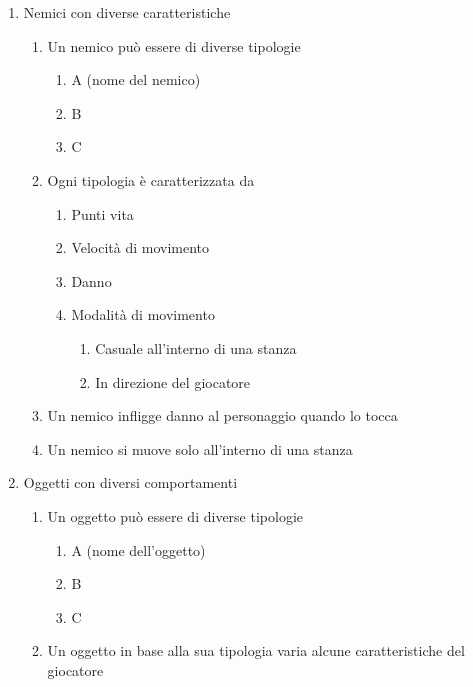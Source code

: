 \begin{enumerate}
    \item Nemici con diverse caratteristiche
    \begin{enumerate}
        \item Un nemico può essere di diverse tipologie
             \begin{enumerate}
                \item A (nome del nemico)
                \item B
                \item C
            \end{enumerate}
        \item Ogni tipologia è caratterizzata da
            \begin{enumerate}
                \item Punti vita
                \item Velocità di movimento
                \item Danno
                \item Modalità di movimento
                 \begin{enumerate}
                    \item Casuale all'interno di una stanza
                    \item In direzione del giocatore
                \end{enumerate}
            \end{enumerate}
        \item Un nemico infligge danno al personaggio quando lo tocca
        \item Un nemico si muove solo all'interno di una stanza
    \end{enumerate}
    
    \item Oggetti con diversi comportamenti
    \begin{enumerate}
        \item Un oggetto può essere di diverse tipologie
             \begin{enumerate}
                \item A (nome dell'oggetto)
                \item B
                \item C
            \end{enumerate}
        \item Un oggetto in base alla sua tipologia varia alcune caratteristiche del giocatore 
    \end{enumerate}
\end{enumerate}


